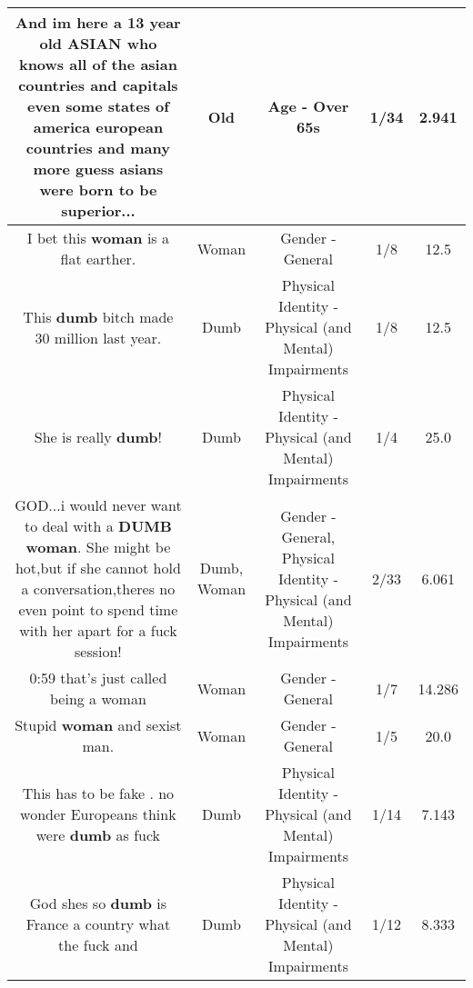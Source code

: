 \documentclass[11pt]{article}
\newlength\mylength
\begin{document}
\begin{center}
\begin{longtable}{|C{.65\mylength}|C{.30\mylength}|C{.12\mylength}|C{.12\mylength}|C{.12\mylength}|}
  \small And im here a 13 year \textbf{old} ASIAN who knows all of the asian countries and capitals even some states of america european countries and many more guess asians were born to be superior...\normalsize   & Old & Age - Over 65s & 1/34 & 2.941 \\  \hline
  \small I bet this \textbf{woman} is a flat earther.\normalsize   & Woman & Gender - General & 1/8 & 12.5 \\  \hline
  \small This \textbf{dumb} bitch made 30 million last year.\normalsize   & Dumb & Physical Identity - Physical (and Mental) Impairments & 1/8 & 12.5 \\  \hline
  \small She is really \textbf{dumb}!\normalsize   & Dumb & Physical Identity - Physical (and Mental) Impairments & 1/4 & 25.0 \\  \hline
  \small GOD...i would never want to deal with a \textbf{DUMB} \textbf{woman}. She might be hot,but if she cannot hold a conversation,theres no even point to spend time with her apart for a fuck session!\normalsize   & Dumb, Woman & Gender - General, Physical Identity - Physical (and Mental) Impairments & 2/33 & 6.061 \\  \hline
  \small 0:59 that's just called being a woman\normalsize   & Woman & Gender - General & 1/7 & 14.286 \\  \hline
  \small Stupid \textbf{woman} and sexist man.\normalsize   & Woman & Gender - General & 1/5 & 20.0 \\  \hline
  \small This has to be fake . no wonder Europeans think were \textbf{dumb} as fuck\normalsize   & Dumb & Physical Identity - Physical (and Mental) Impairments & 1/14 & 7.143 \\  \hline
  \small God shes so \textbf{dumb} is France a country what the fuck and\normalsize   & Dumb & Physical Identity - Physical (and Mental) Impairments & 1/12 & 8.333 \\  \hline

\end{longtable}
\end{center}
\end{document}
